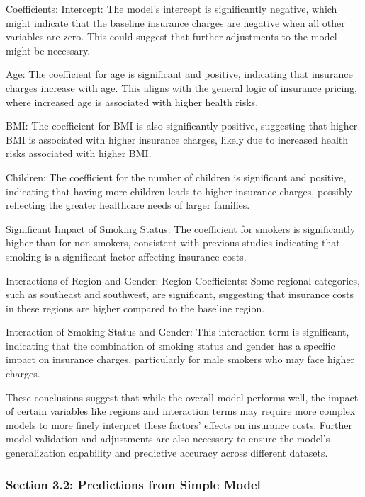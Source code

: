 \documentclass[
  12pt,
]{article}
\begin{document}
Coefficients: Intercept: The model's intercept is significantly
negative, which might indicate that the baseline insurance charges are
negative when all other variables are zero. This could suggest that
further adjustments to the model might be necessary.

Age: The coefficient for age is significant and positive, indicating
that insurance charges increase with age. This aligns with the general
logic of insurance pricing, where increased age is associated with
higher health risks.

BMI: The coefficient for BMI is also significantly positive, suggesting
that higher BMI is associated with higher insurance charges, likely due
to increased health risks associated with higher BMI.

Children: The coefficient for the number of children is significant and
positive, indicating that having more children leads to higher insurance
charges, possibly reflecting the greater healthcare needs of larger
families.

Significant Impact of Smoking Status: The coefficient for smokers is
significantly higher than for non-smokers, consistent with previous
studies indicating that smoking is a significant factor affecting
insurance costs.

Interactions of Region and Gender: Region Coefficients: Some regional
categories, such as southeast and southwest, are significant, suggesting
that insurance costs in these regions are higher compared to the
baseline region.

Interaction of Smoking Status and Gender: This interaction term is
significant, indicating that the combination of smoking status and
gender has a specific impact on insurance charges, particularly for male
smokers who may face higher charges.

These conclusions suggest that while the overall model performs well,
the impact of certain variables like regions and interaction terms may
require more complex models to more finely interpret these factors'
effects on insurance costs. Further model validation and adjustments are
also necessary to ensure the model's generalization capability and
predictive accuracy across different datasets.

\subsubsection{Section 3.2: Predictions from Simple
Model}\label{section-3.2-predictions-from-simple-model}
\end{document}
